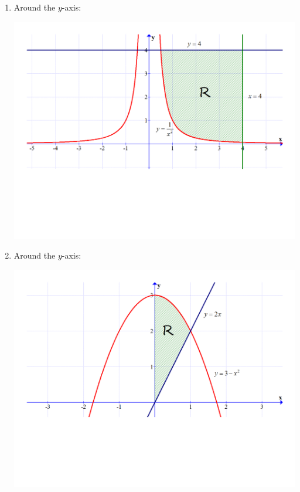 \documentclass[12pt]{article}
\newif\ifans
\begin{document}
\begin{enumerate}
\begin{enumerate}
\begin{center}
\end{center}

\ifans{\fbox{$\pi\int_0^1 \left((3-x^2)^2-(2x)^2\right)\,dx$}} \fi

\item Around the $y$-axis:

\begin{center}

\includegraphics[scale=0.3]{graph3.pdf}

\end{center}

\ifans{\fbox{$\pi\int_{\frac{1}{16}}^4 \left(16-\frac{1}{y}\right) \,dy$}} \fi

\item Around the $y$-axis:

\begin{center}

\includegraphics[scale=0.3]{graph2.pdf}

\end{center}

\ifans{\fbox{$\pi\int_0^2 \left(\frac{y}{2}\right)^2 \,dy+\pi\int_2^3 (3-y) \,dy$}} \fi

\end{enumerate}

\end{enumerate}
\end{document}
